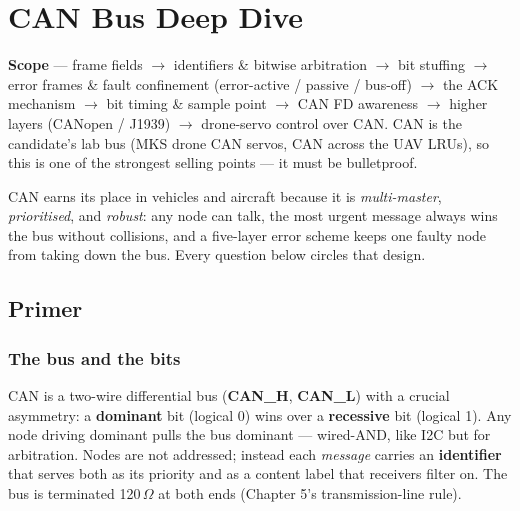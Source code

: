 
\chapter{CAN Bus Deep Dive}
\label{ch:can-bus}

\begin{partnote}
\textbf{Scope} --- frame fields $\rightarrow$ identifiers \& bitwise
arbitration $\rightarrow$ bit stuffing $\rightarrow$ error frames \& fault
confinement (error-active / passive / bus-off) $\rightarrow$ the ACK mechanism
$\rightarrow$ bit timing \& sample point $\rightarrow$ CAN FD awareness
$\rightarrow$ higher layers (CANopen / J1939) $\rightarrow$ drone-servo control
over CAN. CAN is the candidate's lab bus (MKS drone CAN servos, CAN across the
UAV LRUs), so this is one of the strongest selling points --- it must be
bulletproof.
\end{partnote}

CAN earns its place in vehicles and aircraft because it is \emph{multi-master},
\emph{prioritised}, and \emph{robust}: any node can talk, the most urgent
message always wins the bus without collisions, and a five-layer error scheme
keeps one faulty node from taking down the bus. Every question below circles
that design.

\section{Primer}

\subsection{The bus and the bits}

CAN is a two-wire differential bus (\textbf{CAN\_H}, \textbf{CAN\_L}) with a
crucial asymmetry: a \textbf{dominant} bit (logical 0) wins over a
\textbf{recessive} bit (logical 1). Any node driving dominant pulls the bus
dominant --- wired-AND, like I2C but for arbitration. Nodes are not addressed;
instead each \emph{message} carries an \textbf{identifier} that serves both as
its priority and as a content label that receivers filter on. The bus is
terminated 120\,$\Omega$ at both ends (Chapter 5's transmission-line rule).

